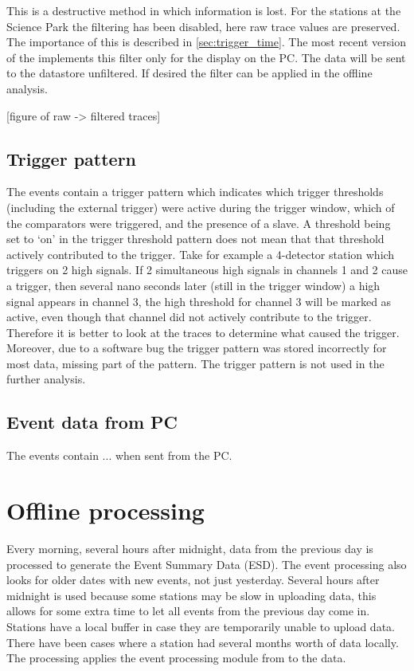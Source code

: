 This is a destructive method in which information is lost. For the \hisparc stations at the Science Park the filtering has been disabled, here raw trace values are preserved. The importance of this is described in \cref{sec:trigger_time}. The most recent version of the \hisparc \daq implements this filter only for the display on the \hisparc PC. The data will be sent to the datastore unfiltered. If desired the filter can be applied in the offline analysis.

[figure of raw -> filtered traces]


\subsection{Trigger pattern}

The \hisparc events contain a trigger pattern which indicates which trigger thresholds (including the external trigger) were active during the trigger window, which of the comparators were triggered, and the presence of a slave. A threshold being set to `on' in the trigger threshold pattern does not mean that that threshold actively contributed to the trigger. Take for example a 4-detector station which triggers on 2 high signals. If 2 simultaneous high signals in channels 1 and 2 cause a trigger, then several nano seconds later (still in the trigger window) a high signal appears in channel 3, the high threshold for channel 3 will be marked as active, even though that channel did not actively contribute to the trigger. Therefore it is better to look at the traces to determine what caused the trigger. Moreover, due to a software bug the trigger pattern was stored incorrectly for most data, missing part of the pattern. The trigger pattern is not used in the further analysis.


\subsection{Event data from PC}

The events contain ... when sent from the PC.


\section{Offline processing}

Every morning, several hours after midnight, data from the previous day is processed to generate the Event Summary Data (ESD). The event processing also looks for older dates with new events, not just yesterday. Several hours after midnight is used because some stations may be slow in uploading data, this allows for some extra time to let all events from the previous day come in. Stations have a local buffer in case they are temporarily unable to upload data. There have been cases where a station had several months worth of data locally. The processing applies the event processing module from \sapphire to the data.


